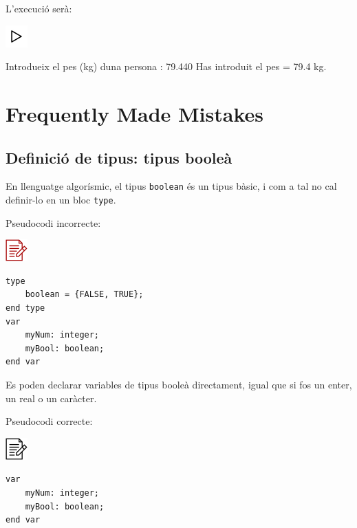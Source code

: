 \documentclass[
]{book}
\newenvironment{Shaded}{\begin{snugshade}}{\end{snugshade}}
\newcommand{\FloatTok}[1]{\textcolor[rgb]{0.00,0.00,0.81}{#1}}
\newcommand{\NormalTok}[1]{#1}
\begin{document}
L'execució serà:

\includegraphics{./img/play.png}

\begin{Shaded}
\begin{Highlighting}[]
\NormalTok{Introdueix el pes (kg) d\textquotesingle{}una persona : }\FloatTok{79.440}
\NormalTok{Has introduit el pes = }\FloatTok{79.4}\NormalTok{ kg.}
\end{Highlighting}
\end{Shaded}

\hypertarget{frequently-made-mistakes}{%
\section{Frequently Made Mistakes}\label{frequently-made-mistakes}}

\hypertarget{definiciuxf3-de-tipus-tipus-booleuxe0}{%
\subsection{Definició de tipus: tipus booleà}\label{definiciuxf3-de-tipus-tipus-booleuxe0}}

En llenguatge algorísmic, el tipus \texttt{boolean} és un tipus bàsic, i com a tal no cal definir-lo en un bloc \texttt{type}.

Pseudocodi incorrecte:

\includegraphics{./img/alg_err.png}

\begin{verbatim}
type
    boolean = {FALSE, TRUE};
end type
var 
    myNum: integer;
    myBool: boolean;
end var
\end{verbatim}

Es poden declarar variables de tipus booleà directament, igual que si fos un enter, un real o un caràcter.

Pseudocodi correcte:

\includegraphics{./img/alg.png}

\begin{verbatim}
var 
    myNum: integer;
    myBool: boolean;
end var
\end{verbatim}
\end{document}
